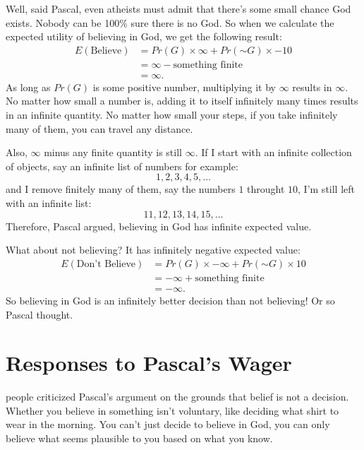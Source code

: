 \documentclass[justified]{tufte-book}
\renewcommand{\neg}{\mathbin{\sim}}
\newcommand{\p}{Pr}
\newcommand{\E}{E}
\theoremstyle{definition}
\theoremstyle{definition}
\theoremstyle{definition}
\theoremstyle{remark}
\begin{document}
Well, said Pascal, even atheists must admit that there's some small chance God exists. Nobody can be 100\% sure there is no God. So when we calculate the expected utility of believing in God, we get the following result:
\[
  \begin{aligned}
    \E(\mbox{Believe}) &= \p(G) \times \infty + \p(\neg G) \times -10\\
                       &= \infty - \mbox{something finite}\\
                       &= \infty.
  \end{aligned}
\]
As long as \(\p(G)\) is some positive number, multiplying it by \(\infty\) results in \(\infty\). No matter how small a number is, adding it to itself infinitely many times results in an infinite quantity. No matter how small your steps, if you take infinitely many of them, you can travel any distance.

Also, \(\infty\) minus any finite quantity is still \(\infty\). If I start with an infinite collection of objects, say an infinite list of numbers for example:
\[ 1, 2, 3, 4, 5, \ldots \]
and I remove finitely many of them, say the numbers \(1\) throught \(10\), I'm still left with an infinite list:
\[ 11, 12, 13, 14, 15, \ldots \]
Therefore, Pascal argued, believing in God has infinite expected value.

What about not believing? It has infinitely negative expected value:
\[
\begin{aligned}
    \E(\mbox{Don't Believe}) &= \p(G) \times -\infty + \p(\neg G) \times 10\\
                             &= -\infty + \mbox{something finite}\\
                             &= -\infty.
  \end{aligned}
\]
So believing in God is an infinitely better decision than not believing! Or so Pascal thought.

\hypertarget{responses-to-pascals-wager}{%
\section{Responses to Pascal's Wager}\label{responses-to-pascals-wager}}

 people criticized Pascal's argument on the grounds that belief is not a decision. Whether you believe in something isn't voluntary, like deciding what shirt to wear in the morning. You can't just decide to believe in God, you can only believe what seems plausible to you based on what you know.
\end{document}
